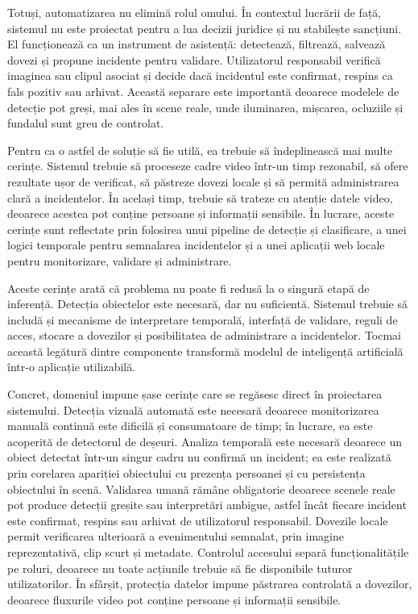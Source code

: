 Totuși, automatizarea nu elimină rolul omului. În contextul lucrării de față, sistemul nu este proiectat pentru a lua decizii juridice și nu stabilește sancțiuni. El funcționează ca un instrument de asistență: detectează, filtrează, salvează dovezi și propune incidente pentru validare. Utilizatorul responsabil verifică imaginea sau clipul asociat și decide dacă incidentul este confirmat, respins ca fals pozitiv sau arhivat. Această separare este importantă deoarece modelele de detecție pot greși, mai ales în scene reale, unde iluminarea, mișcarea, ocluziile și fundalul sunt greu de controlat.

Pentru ca o astfel de soluție să fie utilă, ea trebuie să îndeplinească mai multe cerințe. Sistemul trebuie să proceseze cadre video într-un timp rezonabil, să ofere rezultate ușor de verificat, să păstreze dovezi locale și să permită administrarea clară a incidentelor. În același timp, trebuie să trateze cu atenție datele video, deoarece acestea pot conține persoane și informații sensibile. În lucrare, aceste cerințe sunt reflectate prin folosirea unui pipeline de detecție și clasificare, a unei logici temporale pentru semnalarea incidentelor și a unei aplicații web locale pentru monitorizare, validare și administrare.

Aceste cerințe arată că problema nu poate fi redusă la o singură etapă de inferență. Detecția obiectelor este necesară, dar nu suficientă. Sistemul trebuie să includă și mecanisme de interpretare temporală, interfață de validare, reguli de acces, stocare a dovezilor și posibilitatea de administrare a incidentelor. Tocmai această legătură dintre componente transformă modelul de inteligență artificială într-o aplicație utilizabilă.

Concret, domeniul impune șase cerințe care se regăsesc direct în proiectarea sistemului. Detecția vizuală automată este necesară deoarece monitorizarea manuală continuă este dificilă și consumatoare de timp; în lucrare, ea este acoperită de detectorul de deșeuri. Analiza temporală este necesară deoarece un obiect detectat într-un singur cadru nu confirmă un incident; ea este realizată prin corelarea apariției obiectului cu prezența persoanei și cu persistența obiectului în scenă. Validarea umană rămâne obligatorie deoarece scenele reale pot produce detecții greșite sau interpretări ambigue, astfel încât fiecare incident este confirmat, respins sau arhivat de utilizatorul responsabil. Dovezile locale permit verificarea ulterioară a evenimentului semnalat, prin imagine reprezentativă, clip scurt și metadate. Controlul accesului separă funcționalitățile pe roluri, deoarece nu toate acțiunile trebuie să fie disponibile tuturor utilizatorilor. În sfârșit, protecția datelor impune păstrarea controlată a dovezilor, deoarece fluxurile video pot conține persoane și informații sensibile.


